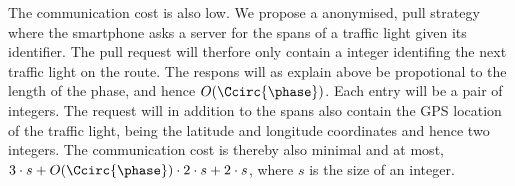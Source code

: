 The communication cost is also low.
We propose a anonymised, pull strategy where the smartphone asks a server for the spans of a traffic light given its identifier.
The pull request will therfore only contain a integer identifing the next traffic light on the route.
The respons will as explain above be propotional to the length of the phase, and hence $O(\Ccirc{\phase})$.
Each entry will be a pair of integers.
The request will in addition to the spans also contain the GPS location of the traffic light, being the latitude and longitude coordinates and hence two integers.
The communication cost is thereby also minimal and at most, $3\cdot s + O(\Ccirc{\phase})\cdot 2\cdot s + 2\cdot s$, where $s$ is the size of an integer.







